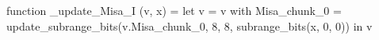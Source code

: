 function _update_Misa_I (v, x) = let v = { v with Misa_chunk_0 = update_subrange_bits(v.Misa_chunk_0, 8, 8, subrange_bits(x, 0, 0)) } in
  v

